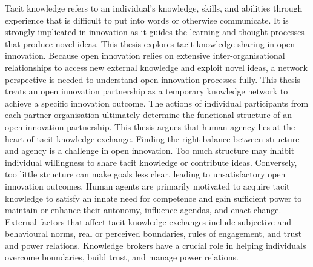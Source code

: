 \documentclass[12pt,table,xcdraw]{book}
\begin{document}
Tacit knowledge refers to an individual's knowledge, skills, and abilities through experience that is difficult to put into words or otherwise communicate. It is strongly implicated in innovation as it guides the learning and thought processes that produce novel ideas. This thesis explores tacit knowledge sharing in open innovation. Because open innovation relies on extensive inter-organisational relationships to access new external knowledge and exploit novel ideas, a network perspective is needed to understand open innovation processes fully. This thesis treats an open innovation partnership as a temporary knowledge network to achieve a specific innovation outcome. The actions of individual participants from each partner organisation ultimately determine the functional structure of an open innovation partnership. This thesis argues that human agency lies at the heart of tacit knowledge exchange. Finding the right balance between structure and agency is a challenge in open innovation. Too much structure may inhibit individual willingness to share tacit knowledge or contribute ideas. Conversely, too little structure can make goals less clear, leading to unsatisfactory open innovation outcomes. Human agents are primarily motivated to acquire tacit knowledge to satisfy an innate need for competence and gain sufficient power to maintain or enhance their autonomy, influence agendas, and enact change. External factors that affect tacit knowledge exchanges include subjective and behavioural norms, real or perceived boundaries, rules of engagement, and trust and power relations. Knowledge brokers have a crucial role in helping individuals overcome boundaries, build trust, and manage power relations. \medskip
\end{document}

